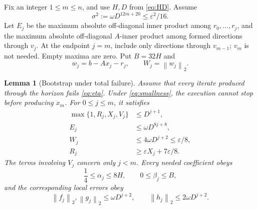 \documentclass[11pt]{article}
\newtheorem{lemma}[theorem]{Lemma}
\theoremstyle{remark}\newtheorem{remark}[theorem]{Remark}
\newcommand{\norm}[1]{\left\lVert#1\right\rVert_2}
\newcommand{\eps}{\varepsilon}
\begin{document}
Fix an integer $1\le m\le n$, and use $H,D$ from \eqref{eq:HD}.
Assume
\begin{equation}\label{eq:smallness}
\sigma^2:=\omega D^{12m+20}\le\eps^2/16.
\end{equation}
Let $E_j$ be the maximum absolute off-diagonal inner product among
$r_0,\ldots,r_j$, and the maximum absolute off-diagonal $A$-inner
product among formed directions through $v_j$. At the endpoint $j=m$,
include only directions through $v_{m-1}$; $v_m$ is not needed.
Empty maxima are zero. Put $B=32H$ and
\[
w_j=b-Ax_j-r_j,\qquad W_j=\norm{w_j}.
\]

\begin{lemma}[Bootstrap under total failure]\label{lem:bootstrap}
Assume that every iterate produced through the horizon fails
\eqref{eq:eta}. Under \eqref{eq:smallness}, the execution cannot stop
before producing $x_m$. For $0\le j\le m$, it satisfies
\begin{align}
\max\{1,R_j,X_j,V_j\}&\le D^{j+1},\label{eq:Mbound}\\
E_j&\le\omega D^{8j+8},\label{eq:Ebound}\\
W_j&\le4\omega D^{j+2}\le\eps/8,\label{eq:Wbound}\\
R_j&\ge\eps X_j+7\eps/8.\label{eq:failR}
\end{align}
The terms involving $V_j$ concern only $j<m$. Every needed coefficient
obeys
\begin{equation}\label{eq:abbounds}
\frac14\le\alpha_j\le8H,\qquad0\le\beta_j\le B,
\end{equation}
and the corresponding local errors obey
\begin{equation}\label{eq:errbounds}
\norm{f_j},\norm{g_j}\le\omega D^{j+2},\qquad
\norm{h_j}\le2\omega D^{j+2}.
\end{equation}
\end{lemma}
\end{document}
